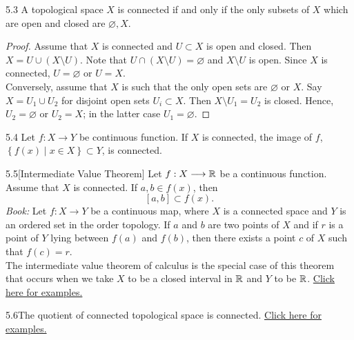 \begin{customthm}{5.3}
A topological space $X$ is connected if and only if the only subsets of $X$ which are open and closed are $\varnothing, X$.
\end{customthm}

\begin{proof}
Assume that $X$ is connected and $U \subset X$ is open and closed. Then $X = U \cup (X \setminus U).$ Note that $U\cap (X \setminus U) = \varnothing$ and $X \setminus U$ is open. Since $X$ is connected, $U = \varnothing$ or $U = X$.\\
Conversely, assume that $X$ is such that the only open sets are $\varnothing$ or $X$. Say $X = U_1 \cup U_2$ for disjoint open sets $U_i \subset X$. Then $X \setminus U_1 = U_2$ is closed. Hence, $U_2 = \varnothing$ or $U_2 = X$; in the latter case $U_1 = \varnothing$.
\end{proof}

\begin{customthm}{5.4}
Let $f: X \longrightarrow Y$ be continuous function. If $X$ is connected, the image of $f$, $\left\{f(x) \mid x \in X\right\} \subset Y$, is connected.
\end{customthm}

\begin{customcoro}{5.5}[Intermediate Value Theorem]
Let $f: X \longrightarrow \mathbb{R}$ be a continuous function. Assume that $X$ is connected. If $a, b \in f(x)$, then 
$$[a, b] \subset f(x).$$
\emph{Book:} Let $f: X \longrightarrow Y$ be a continuous map, where $X$ is a connected space and $Y$ is an ordered set in the order topology. If $a$ and $b$ are two points of $X$ and if $r$ is a point of $Y$ lying between $f(a)$ and $f(b)$, then there exists a point $c$ of $X$ such that $f(c) = r$. \\
The intermediate value theorem of calculus is the special case of this theorem that occurs when we take $X$ to be a closed interval in $\mathbb{R}$ and $Y$ to be $\mathbb{R}$.
\hypertarget{Corollary_5.5}{\hyperlink{ex.c.5.5}{Click here for examples.}}
\end{customcoro}

\begin{customcoro}{5.6}The quotient of connected topological space is connected. \hypertarget{Corollary_5.6}{\hyperlink{ex.c.5.6}{Click here for examples.}}
\end{customcoro}

